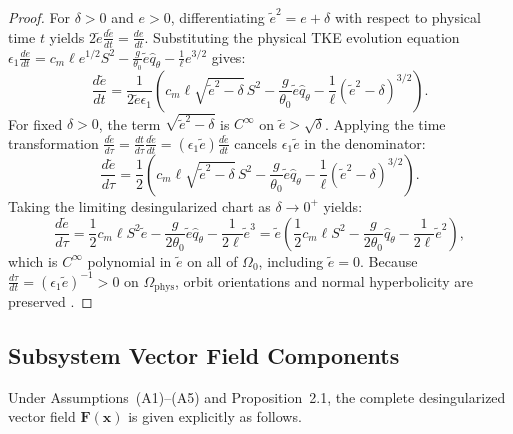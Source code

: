 \begin{proof}
For $\delta > 0$ and $e > 0$, differentiating $\tilde e^2 = e + \delta$ with respect to physical time $t$ yields $2\tilde e \frac{d\tilde e}{dt} = \frac{de}{dt}$. Substituting the physical TKE evolution equation $\epsilon_1 \frac{de}{dt} = c_m \ell e^{1/2} S^2 - \frac{g}{\theta_0} \tilde e \hat q_\theta - \frac{1}{\ell} e^{3/2}$ gives:
\begin{equation}
\frac{d\tilde e}{dt} = \frac{1}{2\tilde e \epsilon_1} \left( c_m \ell \sqrt{\tilde e^2 - \delta}\,S^2 - \frac{g}{\theta_0} \tilde e \hat q_\theta - \frac{1}{\ell}(\tilde e^2 - \delta)^{3/2} \right).
\end{equation}
For fixed $\delta > 0$, the term $\sqrt{\tilde e^2 - \delta}$ is $C^\infty$ on $\tilde e > \sqrt{\delta}$. Applying the time transformation $\frac{d\tilde e}{d\tau} = \frac{dt}{d\tau}\frac{d\tilde e}{dt} = (\epsilon_1 \tilde e)\frac{d\tilde e}{dt}$ cancels $\epsilon_1 \tilde e$ in the denominator:
\begin{equation}
\frac{d\tilde e}{d\tau} = \frac{1}{2}\left( c_m \ell \sqrt{\tilde e^2 - \delta}\,S^2 - \frac{g}{\theta_0} \tilde e \hat q_\theta - \frac{1}{\ell}(\tilde e^2 - \delta)^{3/2} \right).
\end{equation}
Taking the limiting desingularized chart as $\delta \to 0^+$ yields:
\begin{equation}
\frac{d\tilde e}{d\tau} = \frac{1}{2} c_m \ell S^2 \tilde e - \frac{g}{2\theta_0} \tilde e \hat q_\theta - \frac{1}{2\ell} \tilde e^3 = \tilde e \left( \frac{1}{2} c_m \ell S^2 - \frac{g}{2\theta_0} \hat q_\theta - \frac{1}{2\ell} \tilde e^2 \right),
\end{equation}
which is $C^\infty$ polynomial in $\tilde e$ on all of $\Omega_0$, including $\tilde e = 0$. Because $\frac{d\tau}{dt} = (\epsilon_1 \tilde e)^{-1} > 0$ on $\Omega_{\mathrm{phys}}$, orbit orientations and normal hyperbolicity are preserved \citep{Fenichel1979, Kuehn2015}.
\end{proof}

\subsection{Subsystem Vector Field Components}

Under Assumptions~(A1)--(A5) and Proposition~2.1, the complete desingularized vector field $\mathbf{F}(\mathbf{x})$ is given explicitly as follows.

